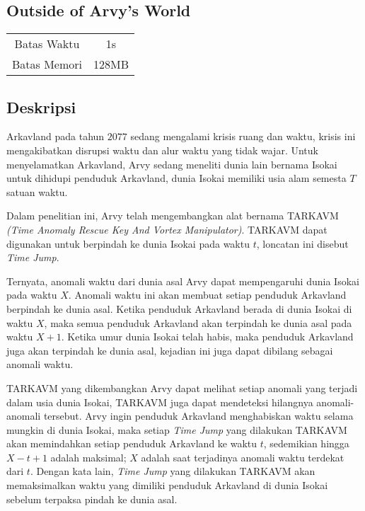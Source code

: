 \documentclass{article}
\begin{document}
\begin{center}
    \section*{Outside of Arvy's World} %

    \begin{tabular}{ | c c | }
        \hline
        Batas Waktu  & 1s \\    %
        Batas Memori & 128MB \\  %
        \hline
    \end{tabular}
\end{center}

\subsection*{Deskripsi}

Arkavland pada tahun $2077$ sedang mengalami krisis ruang dan waktu, krisis ini mengakibatkan disrupsi waktu dan alur waktu yang tidak wajar.
Untuk menyelamatkan Arkavland, Arvy sedang meneliti dunia lain bernama Isokai untuk dihidupi penduduk Arkavland, dunia Isokai memiliki usia alam semesta $T$ satuan waktu.

Dalam penelitian ini, Arvy telah mengembangkan alat bernama TARKAVM \textit{(Time Anomaly Rescue Key And Vortex Manipulator)}. TARKAVM dapat digunakan untuk berpindah ke dunia Isokai pada waktu $t$, loncatan ini disebut \textit{Time Jump}.

Ternyata, anomali waktu dari dunia asal Arvy dapat mempengaruhi dunia Isokai pada waktu $X$. Anomali waktu ini akan membuat setiap penduduk Arkavland berpindah ke dunia asal.
Ketika penduduk Arkavland berada di dunia Isokai di waktu $X$, maka semua penduduk Arkavland akan terpindah ke dunia asal pada waktu $X+1$.
Ketika umur dunia Isokai telah habis, maka penduduk Arkavland juga akan terpindah ke dunia asal, kejadian ini juga dapat dibilang sebagai anomali waktu.

TARKAVM yang dikembangkan Arvy dapat melihat setiap anomali yang terjadi dalam usia dunia Isokai, TARKAVM juga dapat mendeteksi hilangnya anomali-anomali tersebut.
Arvy ingin penduduk Arkavland menghabiskan waktu selama mungkin di dunia Isokai,
maka setiap \textit{Time Jump} yang dilakukan TARKAVM akan memindahkan setiap penduduk Arkavland ke waktu $t$, sedemikian hingga $X-t+1$ adalah maksimal; $X$ adalah saat terjadinya anomali waktu terdekat dari $t$.
Dengan kata lain, \textit{Time Jump} yang dilakukan TARKAVM akan memaksimalkan waktu yang dimiliki penduduk Arkavland di dunia Isokai sebelum terpaksa pindah ke dunia asal.
\end{document}
